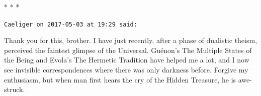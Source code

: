 
\begin{center}* * *\end{center}

\begin{footnotesize}
\begin{sffamily}
\texttt{Caeliger on 2017-05-03 at 19:29 said:}

Thank you for this, brother. I have just recently, after a phase of dualistic theism, perceived the faintest glimpse of the Universal. Guénon's The Multiple States of the Being and Evola's The Hermetic Tradition have helped me a lot, and I now see invisible correspondences where there was only darkness before. Forgive my enthusiasm, but when man first hears the cry of the Hidden Treasure, he is awe-struck.

\hfill

\end{sffamily}
\end{footnotesize}

